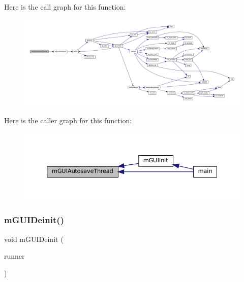 Here is the call graph for this function\+:
\nopagebreak
\begin{figure}[H]
\begin{center}
\leavevmode
\includegraphics[width=350pt]{gui-runner_8c_a893aeb86364bda67a415a000c4a690d6_cgraph}
\end{center}
\end{figure}
Here is the caller graph for this function\+:
\nopagebreak
\begin{figure}[H]
\begin{center}
\leavevmode
\includegraphics[width=350pt]{gui-runner_8c_a893aeb86364bda67a415a000c4a690d6_icgraph}
\end{center}
\end{figure}
\mbox{\label{gui-runner_8c_a678712d99d73e15cac15d188ea82d5d8}} 
\subsubsection{\texorpdfstring{m\+G\+U\+I\+Deinit()}{mGUIDeinit()}}
{\footnotesize\ttfamily void m\+G\+U\+I\+Deinit (\begin{DoxyParamCaption}\item[{struct \mbox{\hyperlink{structm_g_u_i_runner}{m\+G\+U\+I\+Runner}} $\ast$}]{runner }\end{DoxyParamCaption})}

